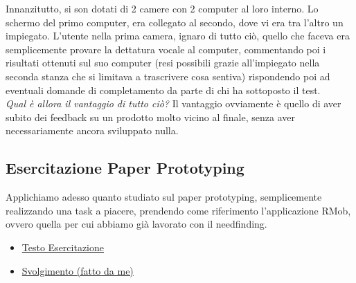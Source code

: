 \documentclass[oneside]{book}
\begin{document}
			Innanzitutto, si son dotati di 2 camere con 2 computer al loro interno. Lo schermo del primo computer, era collegato al secondo, dove vi era tra l'altro un impiegato. L'utente nella prima camera, ignaro di tutto ciò, quello che faceva era semplicemente provare la dettatura vocale al computer, commentando poi i risultati ottenuti sul suo computer (resi possibili grazie all'impiegato nella seconda stanza che si limitava a trascrivere cosa sentiva) rispondendo poi ad eventuali domande di completamento da parte di chi ha sottoposto il test. \\

			\emph{Qual è allora il vantaggio di tutto ciò?} Il vantaggio ovviamente è quello di aver subito dei feedback su un prodotto molto vicino al finale, senza aver necessariamente ancora sviluppato nulla.

		\subsection{Esercitazione Paper Prototyping}
			Applichiamo adesso quanto studiato sul paper prototyping, semplicemente realizzando una task a piacere, prendendo come riferimento l'applicazione RMob, ovvero quella per cui abbiamo già lavorato con il needfinding.

			\begin{itemize}
			\item \href{https://dl.dropboxusercontent.com/u/20679042/IUM%202015-2016/Esercitazione%20prototyping%202015-16.pdf}{Testo Esercitazione}
			\item \href{https://alexflyce.files.wordpress.com/2016/02/esercitazione-paper-prototyping.pdf}{Svolgimento (fatto da me)}
			\end{itemize}
\end{document}
